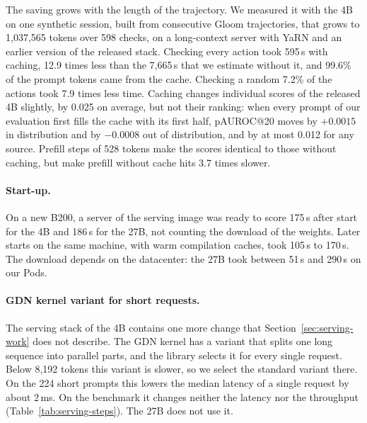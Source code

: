 The saving grows with the length of the trajectory.
We measured it with the 4B on one synthetic session, built from consecutive Gloom trajectories, that grows to 1,037,565 tokens over 598 checks, on a long-context server with YaRN and an earlier version of the released stack.
Checking every action took 595\,s with caching, 12.9 times less than the 7,665\,s that we estimate without it, and 99.6\% of the prompt tokens came from the cache.
Checking a random 7.2\% of the actions took 7.9 times less time.
Caching changes individual scores of the released 4B slightly, by 0.025 on average, but not their ranking: when every prompt of our evaluation first fills the cache with its first half, pAUROC@20 moves by $+0.0015$ in distribution and by $-0.0008$ out of distribution, and by at most 0.012 for any source.
Prefill steps of 528 tokens make the scores identical to those without caching, but make prefill without cache hits 3.7 times slower.

\paragraph{Start-up.}
On a new B200, a server of the serving image was ready to score 175\,s after start for the 4B and 186\,s for the 27B, not counting the download of the weights.
Later starts on the same machine, with warm compilation caches, took 105\,s to 170\,s.
The download depends on the datacenter: the 27B took between 51\,s and 290\,s on our Pods.

\paragraph{GDN kernel variant for short requests.}
The serving stack of the 4B contains one more change that Section~\ref{sec:serving-work} does not describe.
The GDN kernel has a variant that splits one long sequence into parallel parts, and the library selects it for every single request.
Below 8,192 tokens this variant is slower, so we select the standard variant there.
On the 224 short prompts this lowers the median latency of a single request by about 2\,ms.
On the benchmark it changes neither the latency nor the throughput (Table~\ref{tab:serving-steps}).
The 27B does not use it.

